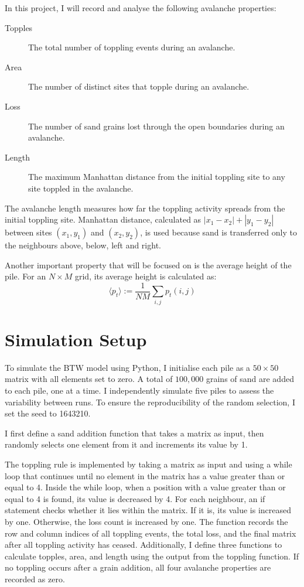 In this project, I will record and analyse the following avalanche properties:

\begin{description}
	\item[Topples] The total number of toppling events during an avalanche.
	\item[Area] The number of distinct sites that topple during an avalanche.
	\item[Loss] The number of sand grains lost through the open boundaries during an avalanche.
	\item[Length] The maximum Manhattan distance from the initial toppling site to any site toppled in the avalanche.
\end{description}

The avalanche length measures how far the toppling activity spreads from the initial toppling site. Manhattan distance, calculated as $|x_1-x_2| + |y_1-y_2|$ between sites $(x_1,y_1)$ and $(x_2,y_2)$, is used because sand is transferred only to the neighbours above, below, left and right.

Another important property that will be focused on is the average height of the pile. For an $N \times M$ grid, its average height is calculated as:
$$\langle p_t \rangle := \frac{1}{NM}\sum_{i,j}p_t(i,j) $$

\section{Simulation Setup}

To simulate the BTW model using Python, I initialise each pile as a $50 \times 50$ matrix with all elements set to zero. A total of $100{,}000$ grains of sand are added to each pile, one at a time. I independently simulate five piles to assess the variability between runs. To ensure the reproducibility of the random selection, I set the seed to 1643210. 

I first define a sand addition function that takes a matrix as input, then randomly selects one element from it and increments its value by 1. 

The toppling rule is implemented by taking a matrix as input and using a while loop that continues until no element in the matrix has a value greater than or equal to 4. Inside the while loop, when a position with a value greater than or equal to 4 is found, its value is decreased by 4. For each neighbour, an if statement checks whether it lies within the matrix. If it is, its value is increased by one. Otherwise, the loss count is increased by one. The function records the row and column indices of all toppling events, the total loss, and the final matrix after all toppling activity has ceased. Additionally, I define three functions to calculate topples, area, and length using the output from the toppling function. If no toppling occurs after a grain addition, all four avalanche properties are recorded as zero.

